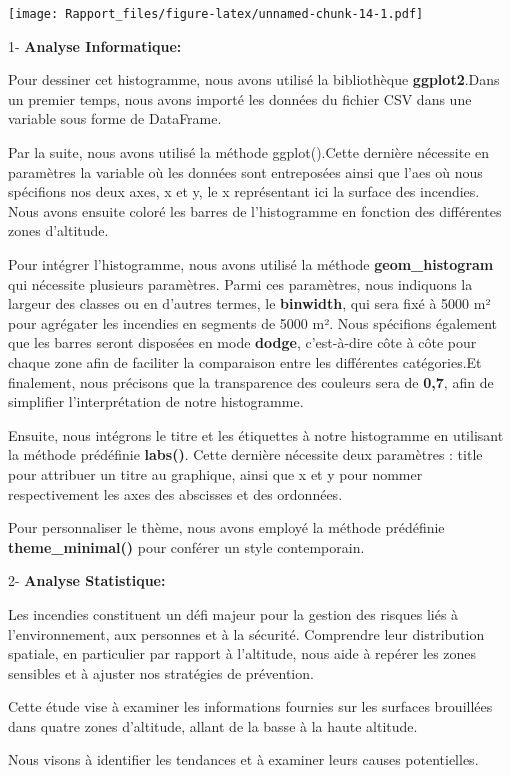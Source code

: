 \documentclass[
]{article}
\begin{document}
\texttt{[image: Rapport\_files/figure-latex/unnamed-chunk-14-1.pdf]}

1- \textbf{Analyse Informatique:}

Pour dessiner cet histogramme, nous avons utilisé la bibliothèque
\textbf{ggplot2}.Dans un premier temps, nous avons importé les données
du fichier CSV dans une variable sous forme de DataFrame.

Par la suite, nous avons utilisé la méthode ggplot().Cette dernière
nécessite en paramètres la variable où les données sont entreposées
ainsi que l'aes où nous spécifions nos deux axes, x et y, le x
représentant ici la surface des incendies. Nous avons ensuite coloré les
barres de l'histogramme en fonction des différentes zones d'altitude.

Pour intégrer l'histogramme, nous avons utilisé la méthode
\textbf{geom\_histogram} qui nécessite plusieurs paramètres. Parmi ces
paramètres, nous indiquons la largeur des classes ou en d'autres termes,
le \textbf{binwidth}, qui sera fixé à 5000 m² pour agrégater les
incendies en segments de 5000 m². Nous spécifions également que les
barres seront disposées en mode \textbf{dodge}, c'est-à-dire côte à côte
pour chaque zone afin de faciliter la comparaison entre les différentes
catégories.Et finalement, nous précisons que la transparence des
couleurs sera de \textbf{0,7}, afin de simplifier l'interprétation de
notre histogramme.

Ensuite, nous intégrons le titre et les étiquettes à notre histogramme
en utilisant la méthode prédéfinie \textbf{labs()}. Cette dernière
nécessite deux paramètres : title pour attribuer un titre au graphique,
ainsi que x et y pour nommer respectivement les axes des abscisses et
des ordonnées.

Pour personnaliser le thème, nous avons employé la méthode prédéfinie
\textbf{theme\_minimal()} pour conférer un style contemporain.

2- \textbf{Analyse Statistique:}

Les incendies constituent un défi majeur pour la gestion des risques
liés à l'environnement, aux personnes et à la sécurité. Comprendre leur
distribution spatiale, en particulier par rapport à l'altitude, nous
aide à repérer les zones sensibles et à ajuster nos stratégies de
prévention.

Cette étude vise à examiner les informations fournies sur les surfaces
brouillées dans quatre zones d'altitude, allant de la basse à la haute
altitude.

Nous visons à identifier les tendances et à examiner leurs causes
potentielles.
\end{document}
